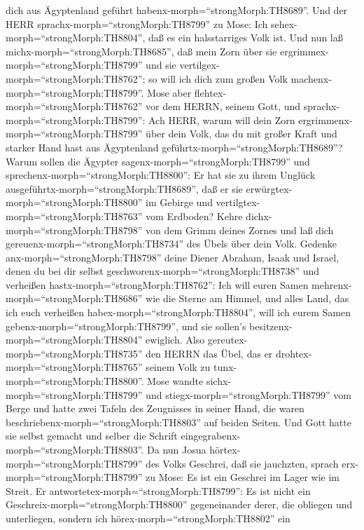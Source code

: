 dich aus Ägyptenland geführt habenx-morph=``strongMorph:TH8689''.
 Und der HERR sprachx-morph=``strongMorph:TH8799'' zu Mose:
Ich sehex-morph=``strongMorph:TH8804'', daß es ein halsstarriges Volk
ist.  Und nun laß michx-morph=``strongMorph:TH8685'', daß
mein Zorn über sie ergrimmex-morph=``strongMorph:TH8799'' und sie
vertilgex-morph=``strongMorph:TH8762''; so will ich dich zum großen Volk
machenx-morph=``strongMorph:TH8799''.  Mose aber
flehtex-morph=``strongMorph:TH8762'' vor dem HERRN, seinem Gott, und
sprachx-morph=``strongMorph:TH8799'': Ach HERR, warum will dein Zorn
ergrimmenx-morph=``strongMorph:TH8799'' über dein Volk, das du mit
großer Kraft und starker Hand hast aus Ägyptenland
geführtx-morph=``strongMorph:TH8689''?  Warum sollen die
Ägypter sagenx-morph=``strongMorph:TH8799'' und
sprechenx-morph=``strongMorph:TH8800'': Er hat sie zu ihrem Unglück
ausgeführtx-morph=``strongMorph:TH8689'', daß er sie
erwürgtex-morph=``strongMorph:TH8800'' im Gebirge und
vertilgtex-morph=``strongMorph:TH8763'' vom Erdboden? Kehre
dichx-morph=``strongMorph:TH8798'' von dem Grimm deines Zornes und laß
dich gereuenx-morph=``strongMorph:TH8734'' des Übels über dein Volk.
 Gedenke anx-morph=``strongMorph:TH8798'' deine Diener
Abraham, Isaak und Israel, denen du bei dir selbst
geschworenx-morph=``strongMorph:TH8738'' und verheißen
hastx-morph=``strongMorph:TH8762'': Ich will euren Samen
mehrenx-morph=``strongMorph:TH8686'' wie die Sterne am Himmel, und alles
Land, das ich euch verheißen habex-morph=``strongMorph:TH8804'', will
ich eurem Samen gebenx-morph=``strongMorph:TH8799'', und sie sollen's
besitzenx-morph=``strongMorph:TH8804'' ewiglich.  Also
gereutex-morph=``strongMorph:TH8735'' den HERRN das Übel, das er
drohtex-morph=``strongMorph:TH8765'' seinem Volk zu
tunx-morph=``strongMorph:TH8800''.  Mose wandte
sichx-morph=``strongMorph:TH8799'' und
stiegx-morph=``strongMorph:TH8799'' vom Berge und hatte zwei Tafeln des
Zeugnisses in seiner Hand, die waren
beschriebenx-morph=``strongMorph:TH8803'' auf beiden Seiten.
 Und Gott hatte sie selbst gemacht und selber die Schrift
eingegrabenx-morph=``strongMorph:TH8803''.  Da nun Josua
hörtex-morph=``strongMorph:TH8799'' des Volks Geschrei, daß sie
jauchzten, sprach erx-morph=``strongMorph:TH8799'' zu Mose: Es ist ein
Geschrei im Lager wie im Streit.  Er
antwortetex-morph=``strongMorph:TH8799'': Es ist nicht ein
Geschreix-morph=``strongMorph:TH8800'' gegeneinander derer, die obliegen
und unterliegen, sondern ich hörex-morph=``strongMorph:TH8802'' ein
